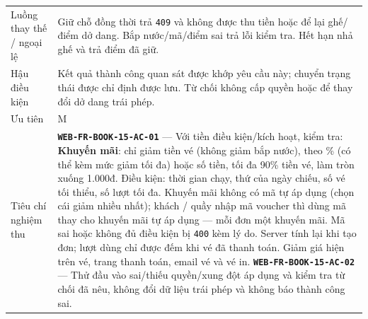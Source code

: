 \begin{longtable}{@{}P{0.23000\SRSWidth}P{0.77000\SRSWidth}@{}}
Luồng thay thế /\allowbreak{} ngoại lệ & Giữ chỗ đồng thời trả \texttt{409} và không được thu tiền hoặc để lại ghế/\allowbreak{}điểm dở dang. Bắp nước/\allowbreak{}mã/\allowbreak{}điểm sai trả lỗi kiểm tra. Hết hạn nhả ghế và trả điểm đã giữ. \\[3pt]
Hậu điều kiện & Kết quả thành công quan sát được khớp yêu cầu này; chuyển trạng thái được chỉ định được lưu. Từ chối không cấp quyền hoặc để thay đổi dở dang trái phép. \\[3pt]
Ưu tiên & M \\[3pt]
Tiêu chí nghiệm thu & \textbf{\texttt{WEB-\allowbreak{}FR-\allowbreak{}BOOK-\allowbreak{}15-\allowbreak{}AC-\allowbreak{}01}} — Với tiền điều kiện/\allowbreak{}kích hoạt, kiểm tra: \textbf{Khuyến mãi}: chỉ giảm tiền vé (không giảm bắp nước), theo \% (có thể kèm mức giảm tối đa) hoặc số tiền, tối đa 90\% tiền vé, làm tròn xuống 1.000đ. Điều kiện: thời gian chạy, thứ của ngày chiếu, số vé tối thiểu, số lượt tối đa. Khuyến mãi không có mã tự áp dụng (chọn cái giảm nhiều nhất); khách /\allowbreak{} quầy nhập mã voucher thì dùng mã thay cho khuyến mãi tự áp dụng — mỗi đơn một khuyến mãi. Mã sai hoặc không đủ điều kiện bị \texttt{400} kèm lý do. Server tính lại khi tạo đơn; lượt dùng chỉ được đếm khi vé đã thanh toán. Giảm giá hiện trên vé, trang thanh toán, email vé và vé in. \textbf{\texttt{WEB-\allowbreak{}FR-\allowbreak{}BOOK-\allowbreak{}15-\allowbreak{}AC-\allowbreak{}02}} — Thử đầu vào sai/\allowbreak{}thiếu quyền/\allowbreak{}xung đột áp dụng và kiểm tra từ chối đã nêu, không đổi dữ liệu trái phép và không báo thành công sai. \\[3pt]

\end{longtable}
